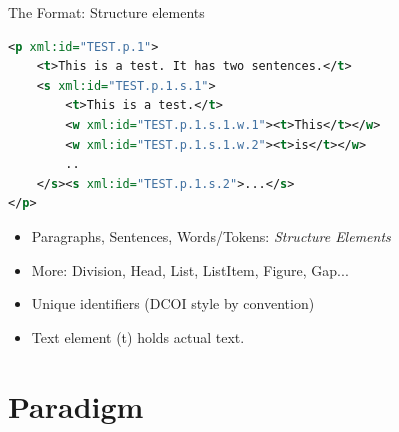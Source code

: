 \documentclass[compress]{beamer}
\begin{document}
\begin{frame}{The Format: Structure elements}
    \begin{example}
     \begin{lstlisting}[language=xml]
<p xml:id="TEST.p.1">
    <t>This is a test. It has two sentences.</t>
    <s xml:id="TEST.p.1.s.1">        
        <t>This is a test.</t>
        <w xml:id="TEST.p.1.s.1.w.1"><t>This</t></w>
        <w xml:id="TEST.p.1.s.1.w.2"><t>is</t></w>
        ..
    </s><s xml:id="TEST.p.1.s.2">...</s>                
</p>                
     \end{lstlisting}
    \end{example}
    \begin{block}
    \begin{itemize}
        \item Paragraphs, Sentences, Words/Tokens: \emph{Structure Elements}    
        \item More: Division, Head, List, ListItem, Figure, Gap...
        \item Unique identifiers (DCOI style by convention)
        \item Text element (t) holds actual text.
    \end{itemize}
    \end{block}
\end{frame}

\section{Paradigm}
\end{document}
